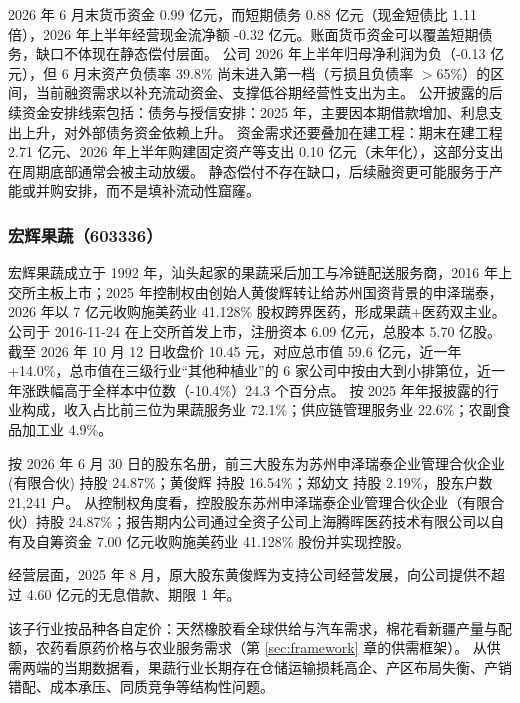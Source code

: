  2026 年 6 月末货币资金 0.99 亿元，而短期债务 0.88 亿元（现金短债比 1.11 倍），2026 年上半年经营现金流净额 -0.32 亿元。账面货币资金可以覆盖短期债务，缺口不体现在静态偿付层面。 公司 2026 年上半年归母净利润为负（-0.13 亿元），但 6 月末资产负债率 39.8\% 尚未进入第一档（亏损且负债率 $>$65\%）的区间，当前融资需求以补充流动资金、支撑低谷期经营性支出为主。 公开披露的后续资金安排线索包括：债务与授信安排：2025 年，主要因本期借款增加、利息支出上升，对外部债务资金依赖上升。 资金需求还要叠加在建工程：期末在建工程 2.71 亿元、2026 年上半年购建固定资产等支出 0.10 亿元（未年化），这部分支出在周期底部通常会被主动放缓。 静态偿付不存在缺口，后续融资更可能服务于产能或并购安排，而不是填补流动性窟窿。




\subsubsection{宏辉果蔬（603336）}
\label{co:603336}

 宏辉果蔬成立于 1992 年，汕头起家的果蔬采后加工与冷链配送服务商，2016 年上交所主板上市；2025 年控制权由创始人黄俊辉转让给苏州国资背景的申泽瑞泰，2026 年以 7 亿元收购施美药业 41.128\% 股权跨界医药，形成果蔬+医药双主业。 公司于 2016-11-24 在上交所首发上市，注册资本 6.09 亿元，总股本 5.70 亿股。 截至 2026 年 10 月 12 日收盘价 10.45 元，对应总市值 59.6 亿元，近一年+14.0\%，总市值在三级行业“其他种植业”的 6 家公司中按由大到小排第位，近一年涨跌幅高于全样本中位数（-10.4\%）24.3 个百分点。 按 2025 年年报披露的行业构成，收入占比前三位为果蔬服务业 72.1\%；供应链管理服务业 22.6\%；农副食品加工业 4.9\%。

 按 2026 年 6 月 30 日的股东名册，前三大股东为苏州申泽瑞泰企业管理合伙企业(有限合伙) 持股 24.87\%；黄俊辉 持股 16.54\%；郑幼文 持股 2.19\%，股东户数 21,241 户。 从控制权角度看，控股股东苏州申泽瑞泰企业管理合伙企业（有限合伙）持股 24.87\%；报告期内公司通过全资子公司上海腾晖医药技术有限公司以自有及自筹资金 7.00 亿元收购施美药业 41.128\% 股份并实现控股。

 经营层面，2025 年 8 月，原大股东黄俊辉为支持公司经营发展，向公司提供不超过 4.60 亿元的无息借款、期限 1 年。

 该子行业按品种各自定价：天然橡胶看全球供给与汽车需求，棉花看新疆产量与配额，农药看原药价格与农业服务需求（第 \ref{sec:framework} 章的供需框架）。 从供需两端的当期数据看，果蔬行业长期存在仓储运输损耗高企、产区布局失衡、产销错配、成本承压、同质竞争等结构性问题。

